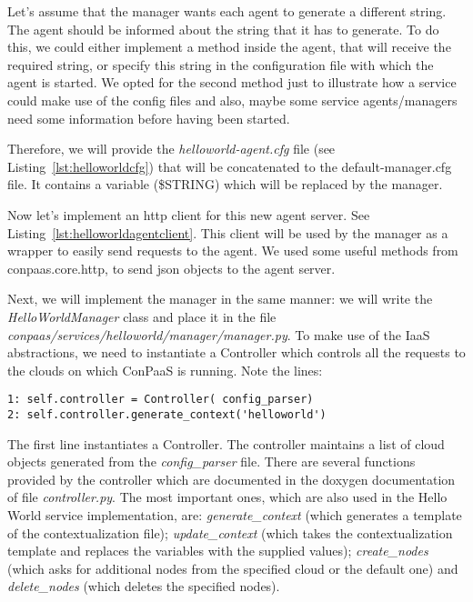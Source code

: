 \documentclass[10pt]{article}
\newcommand{\ConPaaSHOME}{../conpaas-services}
\begin{document}


Let's assume that the manager wants each agent to generate a different string. The agent should be informed about the string that it has to generate. To do this, we could either implement a method inside the agent, that will receive the required string, or specify this string in the configuration file with which the agent is started. We opted for the second method just to illustrate how a service could make use of the config files and also, maybe some service agents/managers need some information before having been started.

Therefore, we will provide the \textit{helloworld-agent.cfg} file (see Listing~\ref{lst:helloworldcfg}) that will be concatenated to the default-manager.cfg file. It contains a variable (\$STRING) which will be replaced by the manager.
 


Now let's implement an http client for this new agent server. See Listing~\ref{lst:helloworldagentclient}. This client will be used by the manager as a wrapper to easily send requests to the agent. We used some useful methods from conpaas.core.http, to send json objects to the agent server. 



Next, we will implement the manager in the same manner: we will write the \textit{HelloWorldManager} class and place it in the file \textit{conpaas/services/helloworld/manager/manager.py}. To make use of the IaaS abstractions, we need to instantiate a Controller which controls all the requests to the clouds on which ConPaaS is running. Note the lines: 

\begin{lstlisting}
1: self.controller = Controller( config_parser)
2: self.controller.generate_context('helloworld')
\end{lstlisting}

The first line instantiates a Controller. The controller maintains a list of cloud objects generated from the \textit{config\_parser} file. There are several functions provided by the controller which are documented in the doxygen documentation of file \textit{controller.py}. The most important ones, which are also used in the Hello World service implementation, are: \textit{generate\_context} (which generates a template of the contextualization file); \textit{update\_context} (which takes the contextualization template and replaces the variables with the supplied values); \textit{create\_nodes} (which asks for additional nodes from the specified cloud or the default one) and \textit{delete\_nodes} (which deletes the specified nodes).
\end{document}
